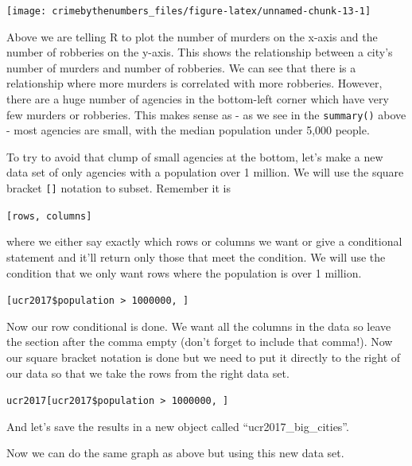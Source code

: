 \documentclass[
  12pt,
  openany]{book}
\newenvironment{Shaded}{\begin{snugshade}}{\end{snugshade}}
\newcommand{\DecValTok}[1]{\textcolor[rgb]{0.06,0.06,0.06}{#1}}
\newcommand{\NormalTok}[1]{#1}
\newcommand{\OtherTok}[1]{\textcolor[rgb]{0.37,0.37,0.37}{#1}}
\newcommand{\SpecialCharTok}[1]{\textcolor[rgb]{0,0,0}{#1}}
\begin{document}
\begin{center}\texttt{[image: crimebythenumbers\_files/figure-latex/unnamed-chunk-13-1]} \end{center}

Above we are telling R to plot the number of murders on the x-axis and the number of robberies on the y-axis. This shows the relationship between a city's number of murders and number of robberies. We can see that there is a relationship where more murders is correlated with more robberies. However, there are a huge number of agencies in the bottom-left corner which have very few murders or robberies. This makes sense as - as we see in the \texttt{summary()} above - most agencies are small, with the median population under 5,000 people.

To try to avoid that clump of small agencies at the bottom, let's make a new data set of only agencies with a population over 1 million. We will use the square bracket \texttt{{[}{]}} notation to subset. Remember it is

\texttt{{[}rows,\ columns{]}}

where we either say exactly which rows or columns we want or give a conditional statement and it'll return only those that meet the condition. We will use the condition that we only want rows where the population is over 1 million.

\texttt{{[}ucr2017\$population\ \textgreater{}\ 1000000,\ {]}}

Now our row conditional is done. We want all the columns in the data so leave the section after the comma empty (don't forget to include that comma!). Now our square bracket notation is done but we need to put it directly to the right of our data so that we take the rows from the right data set.

\texttt{ucr2017{[}ucr2017\$population\ \textgreater{}\ 1000000,\ {]}}

And let's save the results in a new object called ``ucr2017\_big\_cities''.

\begin{Shaded}
\end{Shaded}

Now we can do the same graph as above but using this new data set.
\end{document}
